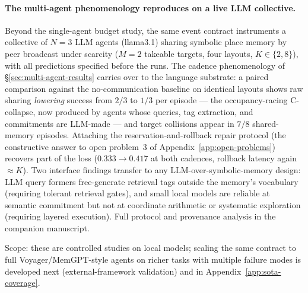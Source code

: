 \documentclass{article}
\begin{document}
\paragraph{The multi-agent phenomenology reproduces on a live LLM collective.}
Beyond the single-agent budget study, the same event contract
instruments a collective of $N{=}3$ LLM agents (llama3.1) sharing
symbolic place memory by peer broadcast under scarcity ($M{=}2$
takeable targets, four layouts, $K\in\{2,8\}$), with all predictions
specified before the runs. The cadence phenomenology of
\S\ref{sec:multi-agent-results} carries over to the language
substrate: a paired comparison against the no-communication baseline
on identical layouts shows raw sharing \emph{lowering} success from
$2/3$ to $1/3$ per episode --- the occupancy-racing C-collapse, now
produced by agents whose queries, tag extraction, and commitments are
LLM-made --- and target collisions appear in $7/8$ shared-memory
episodes. Attaching the reservation-and-rollback repair protocol (the
constructive answer to open problem~3 of
Appendix~\ref{app:open-problems}) recovers part of the loss
($0.333\to0.417$ at both cadences, rollback latency again
${\approx}K$). Two interface findings transfer to any
LLM-over-symbolic-memory design: LLM query formers free-generate
retrieval tags outside the memory's vocabulary (requiring tolerant
retrieval gates), and small local models are reliable at semantic
commitment but not at coordinate arithmetic or systematic exploration
(requiring layered execution). Full protocol and provenance analysis
in the companion manuscript.

Scope: these are controlled studies on local models; scaling the same contract to full Voyager/MemGPT-style agents on richer tasks with multiple failure modes is developed next (external-framework validation) and in Appendix~\ref{app:sota-coverage}.
\end{document}
